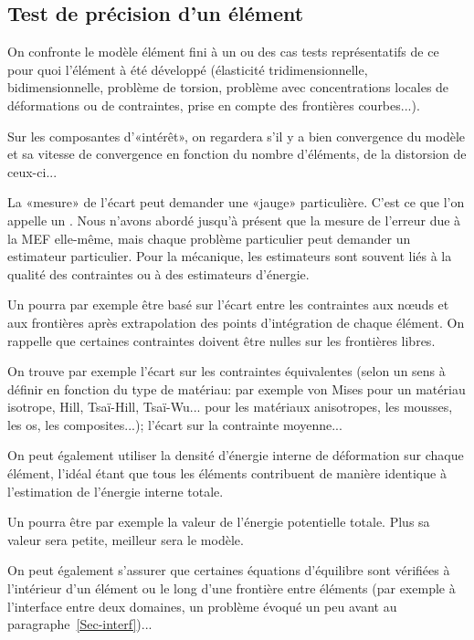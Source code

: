 \medskip
\subsection{Test de précision d'un élément}
On confronte le modèle élément fini à un ou des cas tests représentatifs de ce pour
quoi l'élément à été développé (élasticité tridimensionnelle,
bidimensionnelle, problème de torsion, problème avec concentrations locales de
déformations ou de contraintes, prise en compte des frontières courbes...).

Sur les composantes d'«intérêt», on regardera s'il y a bien convergence
du modèle et sa vitesse de convergence en fonction du nombre d'éléments,
de la distorsion de ceux-ci...

\medskip
La «mesure» de l'écart peut demander une «jauge» particulière.
C'est ce que l'on appelle un .
Nous n'avons abordé jusqu'à présent que la mesure de l'erreur due à la
MEF elle-même, mais chaque problème particulier peut demander un
estimateur particulier.
Pour la mécanique, les estimateurs sont souvent liés à la qualité des
contraintes ou à des estimateurs d'énergie.

\medskip
Un  pourra par exemple être basé
sur l'écart entre les contraintes aux nœuds et aux frontières après
extrapolation des points d'intégration de chaque élément. On rappelle
que certaines contraintes doivent être nulles sur les frontières libres.

On trouve par exemple l'écart sur les contraintes équivalentes (selon un
sens à définir en fonction du type de matériau: par exemple von Mises
pour un matériau isotrope, Hill,
Tsaï-Hill,
Tsaï-Wu...
pour les matériaux anisotropes, les mousses, les os, les composites...);
l'écart sur la contrainte moyenne...

On peut également utiliser la densité d'énergie interne de
déformation sur chaque élément, l'idéal étant que tous les
éléments contribuent de manière identique à l'estimation de
l'énergie interne totale.

\medskip
Un  pourra être par exemple
la valeur de l'énergie potentielle totale. Plus sa valeur sera petite, meilleur
sera le modèle.

\medskip
On peut également s'assurer que certaines équations d'équilibre sont vérifiées
à l'intérieur d'un élément ou le long d'une frontière entre éléments (par
exemple à l'interface entre deux domaines, un problème évoqué un peu avant
au paragraphe~\ref{Sec-interf})...


